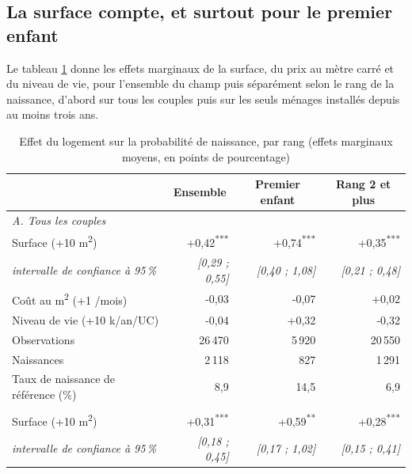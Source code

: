 \documentclass[12pt,a4paper]{article}
\newcommand{\sym}[1]{\textsuperscript{#1}}
\begin{document}
\subsection{La surface compte, et surtout pour le premier enfant}\label{sec:surface}

Le tableau \ref{tab:effet_surface} donne les effets marginaux de la surface, du prix au mètre carré et du niveau de vie, pour l'ensemble du champ puis séparément selon le rang de la naissance, d'abord sur tous les couples puis sur les seuls ménages installés depuis au moins trois ans. \\

\bigskip

\begin{table}[htbp]
	\centering
	\footnotesize
	\setlength{\tabcolsep}{4pt}
	\begin{threeparttable}
		\caption{Effet du logement sur la probabilité de naissance, par rang (effets marginaux moyens, en points de pourcentage)}
		\label{tab:effet_surface}
		\begin{tabular}{lrrr}
			\toprule
			& \multicolumn{1}{c}{Ensemble} & \multicolumn{1}{c}{Premier enfant} & \multicolumn{1}{c}{Rang 2 et plus} \\
			\midrule
			\multicolumn{4}{l}{\textit{A. Tous les couples}} \\
			Surface (+10 m\textsuperscript{2})            & +0,42\sym{***} & +0,74\sym{***} & +0,35\sym{***} \\
			\quad \textit{intervalle de confiance à 95\,\%} & \textit{[0,29 ; 0,55]} & \textit{[0,40 ; 1,08]} & \textit{[0,21 ; 0,48]} \\
			Coût au m\textsuperscript{2} (+1 \texteuro/mois) & -0,03 & -0,07 & +0,02 \\
			Niveau de vie (+10 k\texteuro/an/UC)         & -0,04 & +0,32 & -0,32 \\
			\addlinespace
			Observations                                  & 26\,470 & 5\,920 & 20\,550 \\
			Naissances                                    & 2\,118 & 827 & 1\,291 \\
			Taux de naissance de référence (\%)           & 8,9 & 14,5 & 6,9 \\
			\addlinespace
			\midrule
			\multicolumn{4}{l}{\textit{B. Ménages installés depuis 3 ans ou plus (logement prédéterminé)}} \\
			Surface (+10 m\textsuperscript{2})            & +0,31\sym{***} & +0,59\sym{**} & +0,28\sym{***} \\
			\quad \textit{intervalle de confiance à 95\,\%} & \textit{[0,18 ; 0,45]} & \textit{[0,17 ; 1,02]} & \textit{[0,15 ; 0,41]} \\

\end{tabular}
\end{threeparttable}
\end{table}
\end{document}
